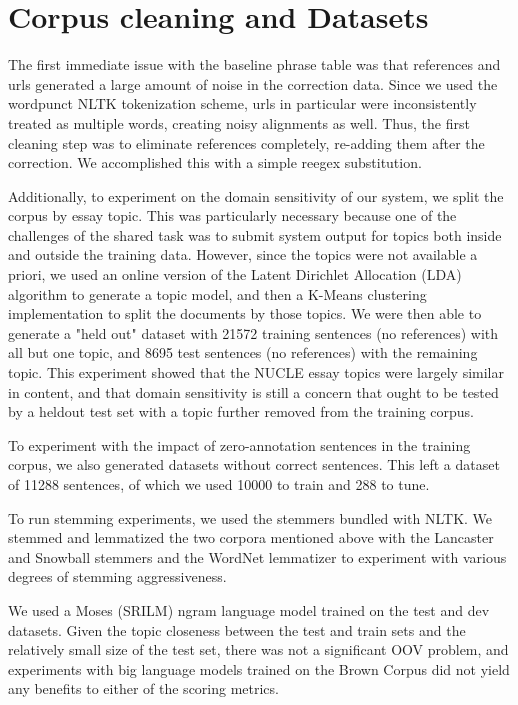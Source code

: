 \documentclass[11pt,letterpaper]{article}
\begin{document}
\section{Corpus cleaning and Datasets}

The first immediate issue with the baseline phrase table was that references and urls generated a large amount of noise in the correction data. Since we used the wordpunct NLTK tokenization scheme, urls in particular were inconsistently treated as multiple words, creating noisy alignments as well. Thus, the first cleaning step was to eliminate references completely, re-adding them after the correction. We accomplished this with a simple reegex substitution. 

Additionally, to experiment on the domain sensitivity of our system, we split the corpus by essay topic. This was particularly necessary because one of the challenges of the shared task was to submit system output for topics both inside and outside the training data. However, since the topics were not available a priori, we used an online version of the Latent Dirichlet Allocation (LDA) algorithm to generate a topic model, and then a K-Means clustering implementation to split the documents by those topics. We were then able to generate a "held out" dataset with 21572 training sentences (no references) with all but one topic, and 8695 test sentences (no references) with the remaining topic. This experiment showed that the NUCLE essay topics were largely similar in content, and that domain sensitivity is still a concern that ought to be tested by a heldout test set with a topic further removed from the training corpus.

To experiment with the impact of zero-annotation sentences in the training corpus, we also generated datasets without correct sentences. This left a dataset of 11288 sentences, of which we used 10000 to train and 288 to tune. 

To run stemming experiments, we used the stemmers bundled with NLTK. We stemmed and lemmatized the two corpora mentioned above with the Lancaster and Snowball stemmers and the WordNet lemmatizer to experiment with various degrees of stemming aggressiveness.

We used a Moses (SRILM) ngram language model trained on the test and dev datasets. Given the topic closeness between the test and train sets and the relatively small size of the test set, there was not a significant OOV problem, and experiments with big language models trained on the Brown Corpus did not yield any benefits to either of the scoring metrics.
\end{document}
